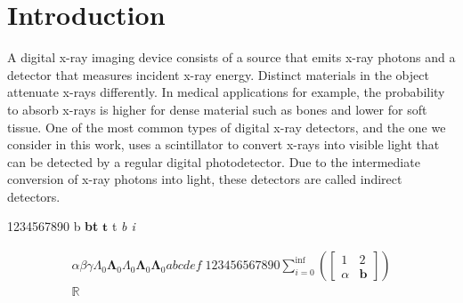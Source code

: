\documentclass[DIV=10,BCOR=1cm,a4paper,parskip,headsepline,english,11pt]{scrbook}
\begin{document}
\frontmatter

\tableofcontents
\mainmatter
\chapter{Introduction}
A digital x-ray imaging device consists of a source that emits x-ray photons and a detector that measures incident x-ray energy. Distinct materials in the object attenuate x-rays differently. In medical applications for example, the probability to absorb x-rays is higher for dense material such as bones and lower for soft tissue.  One of the most common types of digital x-ray detectors, and the one we consider in this work, uses a scintillator to convert x-rays into visible light that can be detected by a regular digital photodetector. Due to the intermediate conversion of x-ray photons into light, these detectors are called indirect detectors. 


\begin{center}
 1234567890 b \textbf{bt} $\mathbf t$ t \textit{b i}
\end{center}

\begin{align}
 \alpha \beta \gamma \Lambda_0 \mathbf \Lambda_0 Λ_0 \boldsymbol Λ_0  \mathbf Λ_0 a b c d e f \; 123456567890 \sum_{i=0}^{\inf} \left( \begin{bmatrix}
                                                                     1 & 2 \\ \alpha & \mathbf b
                                                                    \end{bmatrix} \right)\\
\mathbb R
\end{align}
\end{document}
